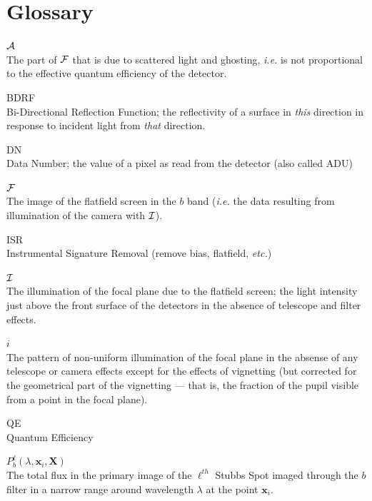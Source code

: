 \documentclass[12pt]{article}
\newcommand{\etc}{\textit{etc.}\xspace}
\newcommand{\ie}{\textit{i.e.}\xspace}
\newcommand{\Xb}{{\boldsymbol X}}
\newcommand{\xb}{{\boldsymbol x}}
\newcommand{\Flat}{{\cal F}}
\newcommand{\screen}{{\cal I}}
\newcommand{\additive}{{\cal A}}
\begin{document}
\section{Glossary}

\begin{description}
  \item $\additive$\\
    The part of $\Flat$ that is due to scattered light and ghosting, \ie is not proportional
    to the effective quantum efficiency of the detector.      

  \item{BDRF}\\
    Bi-Directional Reflection Function; the reflectivity of a surface in \textit{this} direction
    in response to incident light from \textit{that} direction.

  \item{DN}\\
    Data Number; the value of a pixel as read from the detector (also called ADU)

  \item $\Flat$\\
    The image of the flatfield screen in the $b$ band (\ie the data resulting from illumination
    of the camera with $\screen$).

  \item{ISR}\\
    Instrumental Signature Removal (remove bias, flatfield, \etc)

  \item $\screen$\\
    The illumination of the focal plane due to the flatfield screen; the light intensity
    just above the front surface of the detectors in the absence of telescope and filter effects.

  \item $i$\\
    The pattern of non-uniform illumination of the focal plane in the absense of any telescope or camera
    effects except for the effects of vignetting (but corrected for the geometrical part of the
    vignetting --- that is, the fraction of the pupil visible from a point in the focal plane).

  \item{QE}\\
    Quantum Efficiency

  \item $P_b^\ell(\lambda, \xb_i, \Xb)$\\
    The total flux in the primary image of the $\ell^{th}$ Stubbs Spot imaged through the $b$ filter in a
    narrow range around wavelength $\lambda$ at the point $\xb_i$.
    

\end{description}
\end{document}
